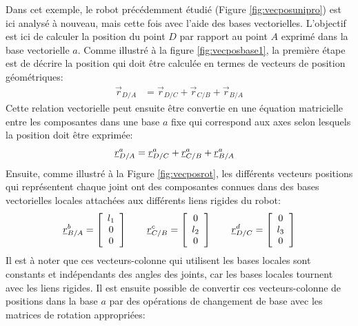 Dans cet exemple, le robot précédemment étudié (Figure \ref{fig:vecposunipro}) est ici analysé à nouveau, mais cette fois avec l'aide des bases vectorielles. L'objectif est ici de calculer la position du point $D$ par rapport au point $A$ exprimé dans la base vectorielle $a$. Comme illustré à la figure \ref{fig:vecposbase1}, la première étape est de décrire la position qui doit être calculée en termes de vecteurs de position géométriques:
\begin{align}
	\vec{r}_{D/A} &= \vec{r}_{D/C} + \vec{r}_{C/B} + \vec{r}_{B/A}
\end{align}
Cette relation vectorielle peut ensuite être convertie en une équation matricielle entre les composantes dans une base $a$ fixe qui correspond aux axes selon lesquels la position doit être exprimée:
\begin{align}
	\underline{r}_{D/A}^a &= \underline{r}_{D/C}^a + \underline{r}_{C/B}^a + \underline{r}_{B/A}^a
	\label{eq:exaddbase}
\end{align}
Ensuite, comme illustré à la Figure \ref{fig:vecposrot}, les différents vecteurs positions qui représentent chaque joint ont des composantes connues dans des bases vectorielles locales attachées aux différents liens rigides du robot:
\begin{align}
	\underline{r}_{B/A}^b =
	\left[ \begin{array}{c}
			   l_1 \\ 0 \\ 0
	\end{array} \right]
	\quad\quad
	\underline{r}_{C/B}^c =
	\left[ \begin{array}{c}
			   0 \\ l_2 \\ 0
	\end{array} \right]
	\quad\quad
	\underline{r}_{D/C}^d =
	\left[ \begin{array}{c}
			   0 \\ l_3 \\ 0
	\end{array} \right]
\end{align}
Il est à noter que ces vecteurs-colonne qui utilisent les bases locales sont constants et indépendants des angles des joints, car les bases locales tournent avec les liens rigides. Il est ensuite possible de convertir ces vecteurs-colonne de positions dans la base $a$ par des opérations de changement de base avec les matrices de rotation appropriées:
